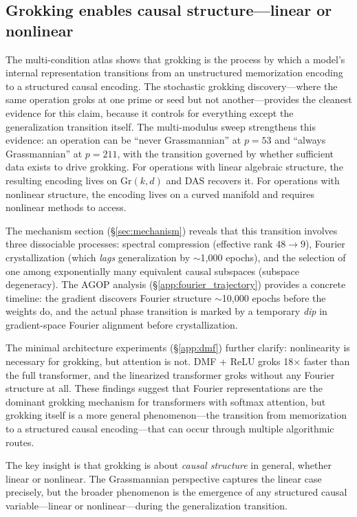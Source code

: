 \documentclass{article}
\newcommand{\Gr}{\mathrm{Gr}}
\begin{document}
\subsection{Grokking enables causal structure---linear or nonlinear}

The multi-condition atlas shows that grokking is the process by which a model's
internal representation transitions from an unstructured memorization encoding to
a structured causal encoding. The stochastic grokking discovery---where the same
operation groks at one prime or seed but not another---provides the cleanest
evidence for this claim, because it controls for everything except the
generalization transition itself. The multi-modulus sweep strengthens this
evidence: an operation can be ``never Grassmannian'' at $p{=}53$ and ``always
Grassmannian'' at $p{=}211$, with the transition governed by whether sufficient
data exists to drive grokking. For operations with linear algebraic structure,
the resulting encoding lives on $\Gr(k,d)$ and DAS recovers it. For operations
with nonlinear structure, the encoding lives on a curved manifold and requires
nonlinear methods to access.

The mechanism section (\S\ref{sec:mechanism}) reveals that this transition
involves three dissociable processes: spectral compression (effective rank
$48 \to 9$), Fourier crystallization (which \emph{lags} generalization by
$\sim$1{,}000 epochs), and the selection of one among exponentially many
equivalent causal subspaces (subspace degeneracy). The AGOP analysis
(\S\ref{app:fourier_trajectory}) provides a concrete timeline: the gradient
discovers Fourier structure $\sim$10{,}000 epochs before the weights do,
and the actual phase transition is marked by a temporary \emph{dip} in
gradient-space Fourier alignment before crystallization.

The minimal architecture experiments (\S\ref{app:dmf}) further clarify:
nonlinearity is necessary for grokking, but attention is not. DMF + ReLU
groks 18$\times$ faster than the full transformer, and the linearized
transformer groks without any Fourier structure at all. These findings
suggest that Fourier representations are the dominant grokking mechanism
for transformers with softmax attention, but grokking itself is a more
general phenomenon---the transition from memorization to a structured
causal encoding---that can occur through multiple algorithmic routes.

The key insight is that grokking is about \emph{causal structure} in general,
whether linear or nonlinear. The Grassmannian perspective captures the linear
case precisely, but the broader phenomenon is the emergence of any structured
causal variable---linear or nonlinear---during the generalization transition.
\end{document}
